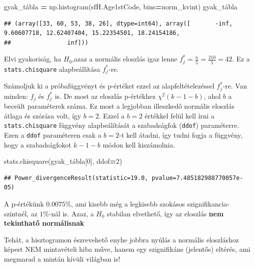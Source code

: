 \documentclass[
]{book}
\newenvironment{Shaded}{\begin{snugshade}}{\end{snugshade}}
\newcommand{\DecValTok}[1]{\textcolor[rgb]{0.00,0.00,0.81}{#1}}
\newcommand{\NormalTok}[1]{#1}
\newcommand{\OperatorTok}[1]{\textcolor[rgb]{0.81,0.36,0.00}{\textbf{#1}}}
\begin{document}
\begin{Shaded}
\begin{Highlighting}[]
\NormalTok{gyak\_tábla }\OperatorTok{=}\NormalTok{ np.histogram(sfH.Age1stCode, bins}\OperatorTok{=}\NormalTok{norm\_kvint)}
\NormalTok{gyak\_tábla}
\end{Highlighting}
\end{Shaded}

\begin{verbatim}
## (array([33, 60, 53, 38, 26], dtype=int64), array([       -inf,  9.60607718, 12.62407404, 15.22354501, 18.24154186,
##                inf]))
\end{verbatim}

Elvi gyakoriság, ha \(H_0\),azaz a normális eloszlás igaz lenne \(f^*_j=\frac{n}{5}=\frac{210}{5}=42\). Ez a \texttt{stats.chisquare} alapbeállítása \(f^*_j\)-re.

Számoljuk ki a próbafüggvényt és p-értéket ezzel az alapfeltételezéssel \(f^*_j\)-re. Van minden: \(f_j\) és \(f^*_j\) is. De most az eloszlás p-értékhez \(\chi^2(k-1-b)\), ahol \(b\) a becsült paraméterek száma. Ez most a legjobban illeszkedő normális eloszlás átlaga és szórása volt, így \(b=2\). Ezzel a \(b=2\) értékkel felül kell írni a \texttt{stats.chisquare} függvény alapbeálítását a szabadságfok (\texttt{ddof}) paraméterre. Ezen a \texttt{ddof} paraméteren csak a \(b=2\)-t kell átadni, így tudni fogja a függvény, hogy a szabadságfokot \(k-1-b\) módon kell kiszámolnia.

\begin{Shaded}
\begin{Highlighting}[]
\NormalTok{stats.chisquare(gyak\_tábla[}\DecValTok{0}\NormalTok{], ddof}\OperatorTok{=}\DecValTok{2}\NormalTok{)}
\end{Highlighting}
\end{Shaded}

\begin{verbatim}
## Power_divergenceResult(statistic=19.0, pvalue=7.485182988770057e-05)
\end{verbatim}

A p-értékünk \(0.0075\%\), ami kisebb még a legkisebb szokásos szignifikancia-szintnél, az \(1\%\)-nál is. Azaz, a \(H_0\) stabilan elvethető, így az eloszlás \textbf{nem tekinthatő normálisnak}

Tehát, a hisztogramon észrevehető enyhe jobbra nyúlás a normális eloszláshoz képest NEM mintavételi hiba műve, hanem egy szignifikáns (jelentős) eltérés, ami megmarad a mintán kívüli világban is!
\end{document}
